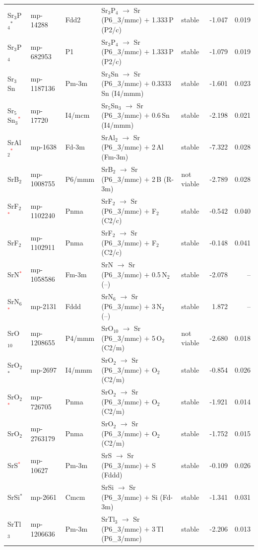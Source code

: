 \begin{longtable}{@{}ll l@{\hspace{4pt}} p{4.6cm} l@{\hspace{4pt}} rr@{}}
Sr$_{3}$P$_{4}$$^*$ & mp-14288 & Fdd2 & Sr$_{3}$P$_{4}$ $\to$ Sr (P6\_3/mmc) $+$ 1.333\,P (P2/c) & stable & -1.047 & 0.019 \\
Sr$_{3}$P$_{4}$ & mp-682953 & P1 & Sr$_{3}$P$_{4}$ $\to$ Sr (P6\_3/mmc) $+$ 1.333\,P (P2/c) & stable & -1.079 & 0.019 \\
Sr$_{3}$Sn & mp-1187136 & Pm-3m & Sr$_{3}$Sn $\to$ Sr (P6\_3/mmc) $+$ 0.3333\,Sn (I4/mmm) & stable & -1.601 & 0.023 \\
Sr$_{5}$Sn$_{3}$\textcolor{red}{$^*$} & mp-17720 & I4/mcm & Sr$_{5}$Sn$_{3}$ $\to$ Sr (P6\_3/mmc) $+$ 0.6\,Sn (I4/mmm) & stable & -2.198 & 0.021 \\
SrAl$_{2}$\textcolor{red}{$^*$} & mp-1638 & Fd-3m & SrAl$_{2}$ $\to$ Sr (P6\_3/mmc) $+$ 2\,Al (Fm-3m) & stable & -7.322 & 0.028 \\
SrB$_{2}$ & mp-1008755 & P6/mmm & SrB$_{2}$ $\to$ Sr (P6\_3/mmc) $+$ 2\,B (R-3m) & not viable & -2.789 & 0.028 \\
SrF$_{2}$\textcolor{red}{$^*$} & mp-1102240 & Pnma & SrF$_{2}$ $\to$ Sr (P6\_3/mmc) $+$ F$_{2}$ (C2/c) & stable & -0.542 & 0.040 \\
SrF$_{2}$ & mp-1102911 & Pnma & SrF$_{2}$ $\to$ Sr (P6\_3/mmc) $+$ F$_{2}$ (C2/c) & stable & -0.148 & 0.041 \\
SrN\textcolor{red}{$^*$} & mp-1058586 & Fm-3m & SrN $\to$ Sr (P6\_3/mmc) $+$ 0.5\,N$_{2}$ (--) & stable & -2.078 & -- \\
SrN$_{6}$\textcolor{red}{$^*$} & mp-2131 & Fddd & SrN$_{6}$ $\to$ Sr (P6\_3/mmc) $+$ 3\,N$_{2}$ (--) & stable & 1.872 & -- \\
SrO$_{10}$ & mp-1208655 & P4/mmm & SrO$_{10}$ $\to$ Sr (P6\_3/mmc) $+$ 5\,O$_{2}$ (C2/m) & not viable & -2.680 & 0.018 \\
SrO$_{2}$$^*$ & mp-2697 & I4/mmm & SrO$_{2}$ $\to$ Sr (P6\_3/mmc) $+$ O$_{2}$ (C2/m) & stable & -0.854 & 0.026 \\
SrO$_{2}$\textcolor{red}{$^*$} & mp-726705 & Pnma & SrO$_{2}$ $\to$ Sr (P6\_3/mmc) $+$ O$_{2}$ (C2/m) & stable & -1.921 & 0.014 \\
SrO$_{2}$ & mp-2763179 & Pnma & SrO$_{2}$ $\to$ Sr (P6\_3/mmc) $+$ O$_{2}$ (C2/m) & stable & -1.752 & 0.015 \\
SrS\textcolor{red}{$^*$} & mp-10627 & Pm-3m & SrS $\to$ Sr (P6\_3/mmc) $+$ S (Fddd) & stable & -0.109 & 0.026 \\
SrSi$^*$ & mp-2661 & Cmcm & SrSi $\to$ Sr (P6\_3/mmc) $+$ Si (Fd-3m) & stable & -1.341 & 0.031 \\
SrTl$_{3}$ & mp-1206636 & Pm-3m & SrTl$_{3}$ $\to$ Sr (P6\_3/mmc) $+$ 3\,Tl (P6\_3/mmc) & stable & -2.206 & 0.013 \\

\end{longtable}
